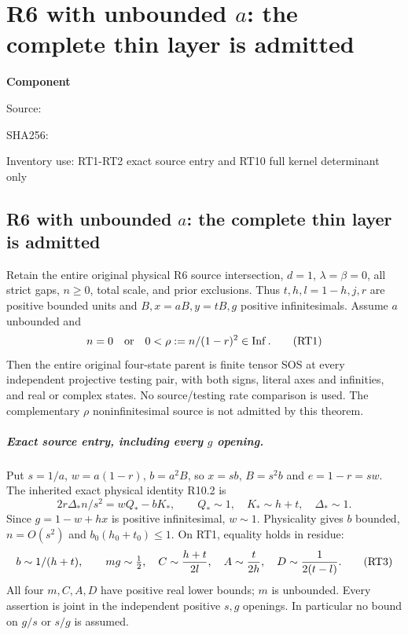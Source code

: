 \chapter{R6 with unbounded $a$: the complete thin layer is admitted}
\label{component:pc82cd677f4b9}
\noindent\textbf{Component }\par
{\small\noindent Source: \par}
{\small\noindent SHA256: \par}
{\small\noindent Inventory use: RT1-RT2 exact source entry and RT10 full kernel determinant only\par}
\medskip
\section{R6 with unbounded $a$: the complete thin layer is admitted}

\begin{theorem}
Retain the entire original physical R6 source intersection, $d=1$,
$\lambda=\beta=0$, all strict gaps, $n\ge0$, total scale, and prior
exclusions. Thus $t,h,l=1-h,j,r$ are positive bounded units and
$B,x=aB,y=tB,g$ positive infinitesimals. Assume $a$ unbounded and
\[
 n=0\quad\hbox{or}\quad 0<\rho:=n/(1-r)^2\in\operatorname{Inf}.
 \tag{RT1}
\]
Then the entire original four-state parent is finite tensor SOS at
every independent projective testing pair, with both signs, literal
axes and infinities, and real or complex states. No source/testing
rate comparison is used. The complementary $\rho$ noninfinitesimal
source is not admitted by this theorem.
\end{theorem}

\paragraph{Exact source entry, including every $g$ opening.}
Put $s=1/a$, $w=a(1-r)$, $b=a^2B$, so $x=sb$, $B=s^2b$ and
$e=1-r=sw$. The inherited exact physical identity R10.2 is
\[
 2r\Delta_*n/s^2=wQ_*-bK_*,\qquad
 Q_*\sim1,\quad K_*\sim h+t,\quad\Delta_*\sim1.       \tag{RT2}
\]
Since $g=1-w+hx$ is positive infinitesimal, $w\sim1$.
Physicality gives $b$ bounded, $n=O(s^2)$ and
$b_0(h_0+t_0)\le1$. On RT1, equality holds in residue:
\[
 b\sim1/(h+t),\qquad
 m g\sim\tfrac12,\quad C\sim{h+t\over2l},\quad
 A\sim{t\over2h},\quad D\sim{1\over2(t-l)}.          \tag{RT3}
\]
All four $m,C,A,D$ have positive real lower bounds; $m$ is unbounded.
Every assertion is joint in the independent positive $s,g$ openings.
In particular no bound on $g/s$ or $s/g$ is assumed.

